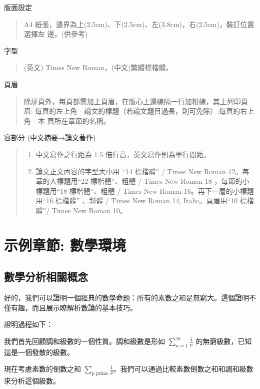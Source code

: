\documentclass[
    writingLanguage=chinese, %
    addPageTitle=on,  %
    addDeclaration=on, %
    addMUSTlog=on, %
    addFigTOC=on, %
    addTabTOC=on, %
    refIndent=off, %
    printMod=off, %
]{must}
\begin{document}
\noindent\faHandORight 版面設定
\begin{quote}
A4 紙張，邊界為上(2.5cm)、下(2.5cm)、左(3.8cm)，右(2.5cm)，裝訂位置選擇左
邊。(供參考)

\end{quote}

\noindent\faHandORight 字型
\begin{quote}
(英文) Times New Roman，(中文)繁體標楷體。
\end{quote}

\noindent\faHandORight 頁眉
\begin{quote}
除扉頁外，每頁都需加上頁眉，在版心上邊線隔一行加粗線，其上列印頁眉:
每頁的左上角 - 論文的標題（若論文題目過長，則可免除）;每頁的右上角 - 本
頁所在章節的名稱。
\end{quote}

\noindent\faHandORight 容部分 (中文摘要→論文著作)
\begin{quote}
\begin{enumerate}
    \item 中文寫作之行距為 1.5 倍行高，英文寫作則為單行間距。
    \item 論文正文內容的字型大小用 “14 標楷體” / Times New Roman 12。每章的大標題用“22 標楷體”、粗體 / Times New Roman 18 ，每節的小標題用“18 標楷體”、粗體 / Times New Roman 16。再下一層的小標題用“16 標楷體” 、斜體 / Times New Roman 14, Italic。頁眉用“10 標楷體”/ Times New Roman 10。
\end{enumerate}
\end{quote}



 



\chapter{示例章節: 數學環境}
\section{數學分析相關概念}
好的，我們可以證明一個經典的數學命題：所有的素數之和是無窮大。這個證明不僅有趣，而且展示瞭解析數論的基本技巧。

證明過程如下：

我們首先回顧調和級數的一個性質。調和級數是形如 \( \sum_{n=1}^{\infty} \frac{1}{n} \) 的無窮級數，已知這是一個發散的級數。

現在考慮素數的倒數之和 \( \sum_{p \text{ prime}} \frac{1}{p} \)。我們可以通過比較素數倒數之和和調和級數來分析這個級數。
\end{document}
